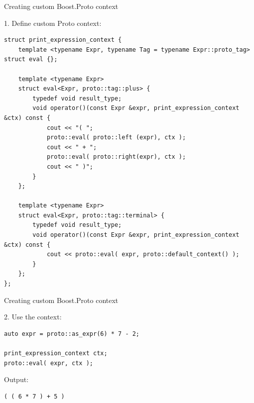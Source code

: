 \documentclass[@BEAMER_OPTIONS@]{beamer}
\begin{document}
\begin{frame}[fragile,shrink=5]{Creating custom Boost.Proto context}
    \begin{exampleblock}{1. Define custom Proto context:}
        \begin{lstlisting}
struct print_expression_context {
    template <typename Expr, typename Tag = typename Expr::proto_tag> struct eval {};

    template <typename Expr>
    struct eval<Expr, proto::tag::plus> {
        typedef void result_type;
        void operator()(const Expr &expr, print_expression_context &ctx) const {
            cout << "( ";
            proto::eval( proto::left (expr), ctx );
            cout << " + ";
            proto::eval( proto::right(expr), ctx );
            cout << " )";
        }
    };

    template <typename Expr>
    struct eval<Expr, proto::tag::terminal> {
        typedef void result_type;
        void operator()(const Expr &expr, print_expression_context &ctx) const {
            cout << proto::eval( expr, proto::default_context() );
        }
    };
};
        \end{lstlisting}
    \end{exampleblock}
\end{frame}

\note{}

\begin{frame}[fragile]{Creating custom Boost.Proto context}
    \begin{exampleblock}{2. Use the context:}
        \begin{lstlisting}
auto expr = proto::as_expr(6) * 7 - 2;

print_expression_context ctx;
proto::eval( expr, ctx );
        \end{lstlisting}
    \end{exampleblock}

    \begin{exampleblock}{Output:}
        \begin{verbatim}
( ( 6 * 7 ) + 5 )
        \end{verbatim}
    \end{exampleblock}
\end{frame}

\note{}
\end{document}
